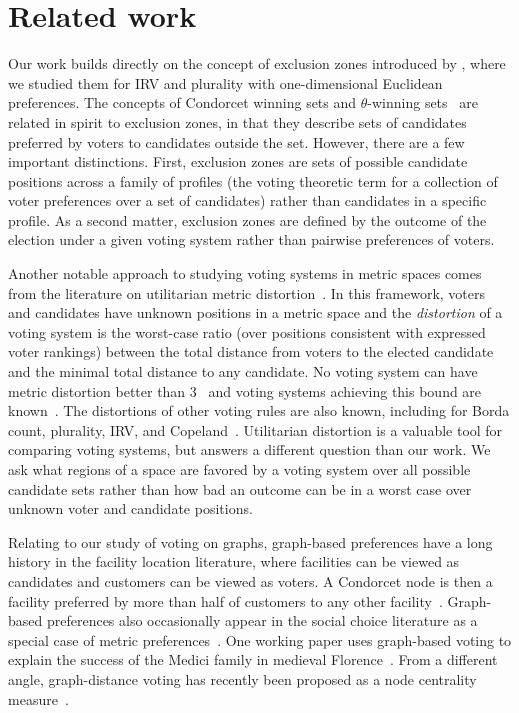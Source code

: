 \section{Related work}
Our work builds directly on the concept of exclusion zones introduced by \citet{tomlinson2024moderating}, where we studied them for IRV and plurality with one-dimensional Euclidean preferences. The concepts of Condorcet winning sets and $\theta$-winning sets~\cite{elkind2011choosing,elkind2015condorcet,bloks2018condorcet,charikar2024six} are related in spirit to exclusion zones, in that they describe sets of candidates preferred by voters to candidates outside the set. However, there are a few important distinctions. First, exclusion zones are sets of possible candidate positions across a family of profiles (the voting theoretic term for a collection of voter preferences over a set of candidates) rather than candidates in a specific profile. As a second matter, exclusion zones are defined by the outcome of the election under a given voting system rather than pairwise preferences of voters.

Another notable approach to studying voting systems in metric spaces comes from the literature on utilitarian metric distortion~\cite{procaccia2006distortion,anshelevich2015approximating,anshelevich2018approximating}. In this framework, voters and candidates have unknown positions in a metric space and the \emph{distortion} of a voting system is the worst-case ratio (over positions consistent with expressed voter rankings) between the total distance from voters to the elected candidate and the minimal total distance to any candidate. No voting system can have metric distortion better than 3~\cite{anshelevich2015approximating} and voting systems achieving this bound are known~\cite{gkatzelis2020resolving,kizilkay2022apluralityveto}. The distortions of other voting rules are also known, including for Borda count, plurality, IRV, and Copeland~\cite{anshelevich2018approximating,anagnostides2022dimensionality}. Utilitarian distortion is a valuable tool for comparing voting systems, but answers a different question than our work. We ask what regions of a space are favored by a voting system over all possible candidate sets rather than how bad an outcome can be in a worst case over unknown voter and candidate positions.  

Relating to our study of voting on graphs, graph-based preferences have a long history in the facility location literature, where facilities can be viewed as candidates and customers can be viewed as voters. A Condorcet node is then a facility preferred by more than half of customers to any other facility~\cite{wendell1981new,bandelt1985networks,hansen1986equivalence}. Graph-based preferences also occasionally appear in the social choice literature as a special case of metric preferences~\cite{skowron2017social}. One working paper uses graph-based voting to explain the success of the Medici family in medieval Florence~\cite{telek2016power}. From a different angle, graph-distance voting has recently been proposed as a node centrality measure~\cite{brandes2022voting,skibski2023closeness}.
